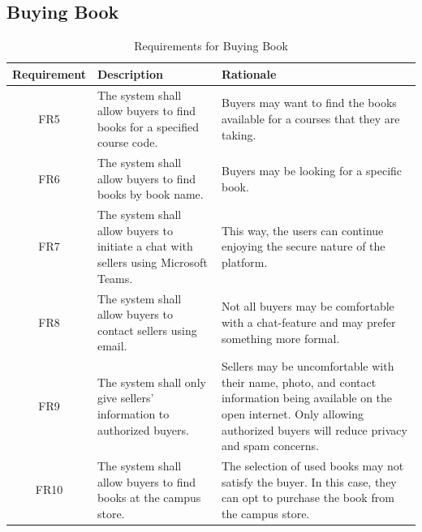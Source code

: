 \documentclass[fullpage]{article}
\begin{document}
\subsection{Buying Book}
\begin{table}[h!]
\flushleft
\begin{tabular}{|c|p{6cm}|p{6cm}|}
\hline
 \rowcolor{lightgray} 
\textbf{Requirement} & \textbf{Description} & \textbf{Rationale} \\
\hline
FR5 &The system shall allow buyers to find books for a specified course code. & Buyers may want to find the books available for a courses that they are taking.\\
\hline
FR6&The system shall allow buyers to find books by book name. & Buyers may be looking for a specific book.\\
\hline
FR7 &The system shall allow buyers to initiate a chat with sellers using Microsoft Teams.
& This way, the users can continue enjoying the secure nature of the platform. \\
\hline
FR8 & The system shall allow buyers to contact sellers using email. & Not all buyers may be comfortable with a chat-feature and may prefer something more formal.\\
\hline
FR9 & The system shall only give sellers' information to authorized buyers. & Sellers may be uncomfortable with their name, photo, and contact information being available on the open internet. Only allowing authorized buyers will reduce privacy and spam concerns.\\
\hline
FR10 & The system shall allow buyers to find books at the campus store. &The selection of used books may not satisfy the buyer. In this case, they can opt to purchase the book from the campus store.\\
\hline
\end{tabular}
\caption{Requirements for Buying Book}
\end{table}

\newpage
\end{document}
